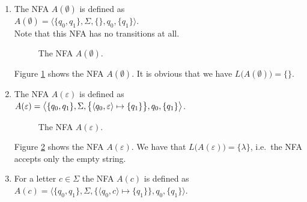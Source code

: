 \begin{enumerate}
\item The \textsc{NFA} $A(\emptyset)$ is defined as
      \\[0.2cm]
      \hspace*{1.3cm}
      $A(\emptyset) = \bigl\langle \{ q_0, q_1 \}, \Sigma, \{\}, q_0, \{ q_1 \} \bigr\rangle$.
      \\[0.2cm]
      Note that this \textsc{NFA} has no transitions at all.

      \begin{figure}[!ht]
        \centering
      \caption{The \textsc{NFA} $A(\emptyset)$.}
      \label{fig:aLeer.eps}
      \end{figure}
      Figure \ref{fig:aLeer.eps} shows the \textsc{NFA} $A(\emptyset)$. It is obvious that we have
      $L\bigl(A(\emptyset)\bigr) = \{\}$. 
\item The \textsc{NFA} $A(\varepsilon)$ is defined as
      \\[0.2cm]
      \hspace*{1.3cm}
      $A(\varepsilon) = \bigl\langle \{ q_0, q_1 \}, \Sigma, 
                          \bigl\{ \pair(q_0, \varepsilon) \mapsto \{q_1\} \bigr\}, q_0, \{ q_1 \} \bigr\rangle$.


      \begin{figure}[!ht]
        \centering
      \caption{The \textsc{NFA} $A(\varepsilon)$.}
      \label{fig:aEpsilon.eps}
      \end{figure}
      Figure \ref{fig:aEpsilon.eps} shows the \textsc{NFA} $A(\varepsilon)$.
      We have that $L\bigl(A(\varepsilon)\bigr) = \{\lambda\}$, i.e.~the \textsc{NFA} accepts only the empty string. 
\item For a letter $c \in \Sigma$ the \textsc{NFA} $A(c)$ is defined as 
      \\[0.2cm]
      \hspace*{1.3cm}
      $A(c) = \bigl\langle \{ q_0, q_1 \}, \Sigma, 
                                \bigl\{ \langle q_0, c \rangle \mapsto \{q_1\}\bigr\}, q_0, \{ q_1 \} \bigr\rangle$.


\end{enumerate}
